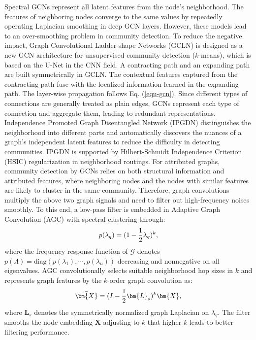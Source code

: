 Spectral GCNs represent all latent features from the node's neighborhood. The features of neighboring nodes converge to the same values by repeatedly operating Laplacian smoothing in deep GCN layers. However, these models lead to an over-smoothing problem in community detection. To reduce the negative impact, Graph Convolutional Ladder-shape Networks (GCLN)  is designed as a new GCN architecture for unsupervised community detection ($k$-means), which is based on the U-Net in the CNN field. A contracting path and an expanding path are built symmetrically in GCLN. The contextual features captured from the contracting path fuse with the localized information learned in the expanding path. The layer-wise propagation follows Eq. (\ref{equ-gcn}).
Since different types of connections are generally treated as plain edges, GCNs represent each type of connection and aggregate them, leading to redundant representations. Independence Promoted Graph Disentangled Network (IPGDN)  distinguishes the neighborhood into different parts and automatically discovers the nuances of a graph's independent latent features to reduce the difficulty in detecting communities. IPGDN is supported by Hilbert-Schmidt Independence Criterion (HSIC) regularization  in neighborhood routings.
For attributed graphs, community detection by GCNs relies on both structural information and attributed features, where neighboring nodes and the nodes with similar features are likely to cluster in the same community. Therefore, graph convolutions multiply the above two graph signals and need to filter out high-frequency noises smoothly. To this end, a low-pass filter is embedded in Adaptive Graph Convolution (AGC)  with spectral clustering through:
\begin{equation}
\small
p(\lambda_q) = (1 - \frac{1}{2} \lambda_q)^k,
\end{equation}
where the frequency response function of $\mathcal{G}$ denotes $p(\Lambda)=\text{diag}\left(p\left(\lambda_1\right),\cdots,p\left(\lambda_n\right)\right)$ decreasing and nonnegative on all eigenvalues. AGC convolutionally selects suitable neighborhood hop sizes in $k$ and represents graph features by the $k$-order graph convolution as:
\begin{equation}
\small
\bar{\bm{X}} = (I - \frac{1}{2}\bm{L}_s)^k\bm{X}, 
\end{equation}
where $\bm{L}_s$ denotes the symmetrically normalized graph Laplacian on $\lambda_q$. The filter smooths the node embedding $\bar{\bm{X}}$ adjusting to $k$ that higher $k$ leads to better filtering performance.
